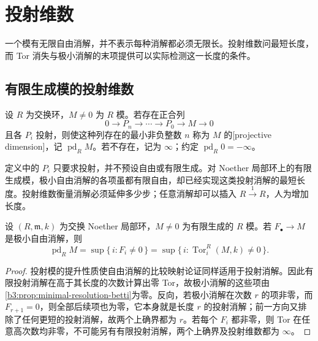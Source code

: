 
\section{投射维数}
\label{b3:sec:1702}

一个模有无限自由消解，并不表示每种消解都必须无限长。投射维数问最短长度，而 Tor 消失与极小消解的末项提供可以实际检测这一长度的条件。

%
%

\subsection{有限生成模的投射维数}
\label{b3:subsec:1702:01}

\begin{definition}\label{b3:def:projective-dimension}
	设 \(R\) 为交换环，\(M\ne0\) 为 \(R\) 模。若存在正合列
	\[
		0\longrightarrow P_n\longrightarrow\cdots\longrightarrow P_0 \longrightarrow M\longrightarrow0
	\]
	且各 \(P_i\) 投射，则使这种列存在的最小非负整数 \(n\) 称为 \(M\) 的[projective dimension]，记 \(\operatorname{pd}_RM\)。若不存在，记为 \(\infty\)；约定 \(\operatorname{pd}_R0=-\infty\)。
\end{definition}

定义中的 \(P_i\) 只要求投射，并不预设自由或有限生成。对 Noether 局部环上的有限生成模，极小自由消解的各项虽都有限自由，却已经实现这类投射消解的最短长度。投射维数衡量消解必须延伸多少步；任意消解却可以插入 \(R\xrightarrow{1}R\)，人为增加长度。

\begin{proposition}\label{b3:prop:pd-minimal-length}
	设 \((R,\mathfrak m,k)\) 为交换 Noether 局部环，\(M\ne0\) 为有限生成的 \(R\) 模。若 \(F_\bullet\rightarrow M\) 是极小自由消解，则
	\[
		\operatorname{pd}_RM=\sup\{\,i:F_i\ne0\,\} =\sup\{\,i:\operatorname{Tor}_i^R(M,k)\ne0\,\}.
	\]
\end{proposition}
\begin{proof}
	投射模的提升性质使自由消解的比较映射论证同样适用于投射消解。因此有限投射消解在高于其长度的次数计算出零 Tor，故极小消解的这些项由\cref{b3:prop:minimal-resolution-betti}为零。反向，若极小消解在次数 \(r\) 的项非零，而 \(F_{r+1}=0\)，则全部后续项也为零，它本身就是长度 \(r\) 的投射消解；前一方向又排除了任何更短的投射消解，故两个上确界都为 \(r\)。若每个 \(F_i\) 都非零，则 Tor 在任意高次数均非零，不可能另有有限投射消解，两个上确界及投射维数都为 \(\infty\)。
\end{proof}


